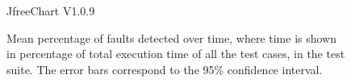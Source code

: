 \begin{figure}[!hb]
	\caption*{JfreeChart V1.0.9}
	\label{fig:jfree5}
	\endminipage\hfill		
	\caption{Mean percentage of faults detected over time, where time is shown in percentage of total execution time of all the test cases, in the test suite. The error bars correspond to the 95\% confidence interval.}	
	\label{fig:FDR}	
	\vspace*{-40pt}
\end{figure}

